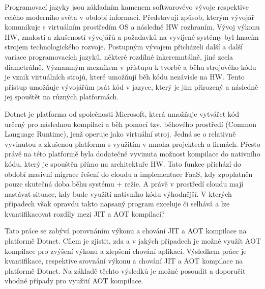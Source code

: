 Programovací jazyky jsou základním kamenem softwarovévo vývoje respektive celého moderního světa v období informací. Představují způsob, kterým vývojář komunikuje s virtuálním prostředím OS a následně HW rozhraním. Vývoj výkonu HW, znalostí a zkušeností vývojářů a požadavků na vyvíjené systémy byl hnacím strojem technologického rozvoje. Postupným vývojem přicházeli další a další variace programovacích jazyků, některé rozdílné inkeremntálně, jiné zcela diametrálně. Významným mezníkem v přístupu k tvorbě a běhu strojového kódu je vznik virtuálních strojů, které umožňují běh kódu nezávisle na HW. Tento přístup umožňuje vývojářům psát kód v jazyce, který je jim přirozený a následně jej spouštět na různých platformách.

Dotnet je platforma od společnosti Microsoft, která umožňuje vytvářet kód určený pro následnou kompilaci a běh pomocí tzv. běhového prostředí (Common Language Runtime), jenž operuje jako virtuální stroj. Jedná se o relativně vyvinutou a zkušenou platformu s využitím v mnoha projektech a firmách. Přesto právě na této platformě byla dodatečně vyvinuta možnost kompilace do nativního kódu, který je spouštěn přímo na architektuře HW. Tato funkce přichází do období masivní migrace řešení do cloudu a implementace FaaS, kdy zpoplatněn pouze skutečná doba běhu systému + režie. A právě v prostředí cloudu mají nastávat situace, kdy bude využití nativního kódu výhodnější. V kterých případech však opravdu takto napsaný program exceluje či selhává a lze kvantifikacovat rozdíly mezi JIT a AOT kompilací?

Tato práce se zabývá porovnáním výkonu a chování JIT a AOT kompilace na platformě Dotnet. Cílem je zjistit, zda a v jakých případech je možné využít AOT kompilace pro zvýšení výkonu a zlepšení chování aplikací. Výsledkem práce je kvantifikace, respektive srovnání výkonu a chování JIT a AOT kompilace na platformě Dotnet. Na základě těchto výsledků je možné posoudit a doporučit vhodné případy pro využití AOT kompilace.